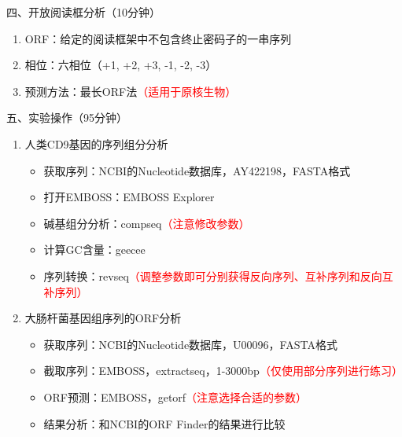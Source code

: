 \documentclass{TIJMUjiaoanSY}
\begin{document}
\noindent
四、开放阅读框分析（10分钟）
\begin{enumerate}
  \item ORF：给定的阅读框架中不包含终止密码子的一串序列
  \item 相位：六相位（+1, +2, +3, -1, -2, -3）
  \item 预测方法：最长ORF法\textcolor{red}{（适用于原核生物）}
\end{enumerate}


\vspace*{0.2cm}
\noindent
五、实验操作（95分钟）
\begin{enumerate}
  \item 人类CD9基因的序列组分分析
    \begin{itemize}
      \item 获取序列：NCBI的Nucleotide数据库，AY422198，FASTA格式
      \item 打开EMBOSS：EMBOSS Explorer
      \item 碱基组分分析：compseq\textcolor{red}{（注意修改参数）}
      \item 计算GC含量：geecee
      \item 序列转换：revseq\textcolor{red}{（调整参数即可分别获得反向序列、互补序列和反向互补序列）}
    \end{itemize}
  \item 大肠杆菌基因组序列的ORF分析
    \begin{itemize}
      \item 获取序列：NCBI的Nucleotide数据库，U00096，FASTA格式
      \item 截取序列：EMBOSS，extractseq，1-3000bp\textcolor{red}{（仅使用部分序列进行练习）}
      \item ORF预测：EMBOSS，getorf\textcolor{red}{（注意选择合适的参数）}
      \item 结果分析：和NCBI的ORF Finder的结果进行比较
    \end{itemize}
\end{enumerate}

\otherTail
\end{document}
